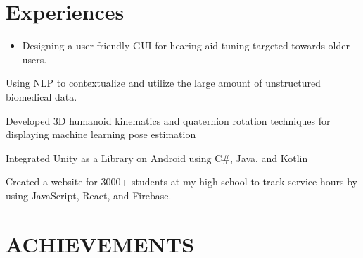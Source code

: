 \documentclass[]{main}
\begin{document}
\begin{minipage}[t]{0.66\textwidth} 


\section{Experiences}

\begin{itemize}
\item Designing a user friendly GUI for hearing aid tuning targeted towards older users.
\end{itemize}
\sectionsep

\begin{tightemize}
\item Using NLP to contextualize and utilize the large amount of unstructured biomedical data.
\end{tightemize}
\sectionsep

\begin{tightemize}
\item Developed 3D humanoid kinematics and quaternion rotation techniques
for displaying machine learning pose estimation
\item Integrated Unity as a Library on Android using C\#, Java, and Kotlin
\end{tightemize}
\sectionsep

\begin{tightemize}
\item Created a website for 3000+ students at my high school to track service hours by using JavaScript, React, and Firebase.
\end{tightemize}
\sectionsep



\section{ACHIEVEMENTS}


\end{minipage}
\end{document}
